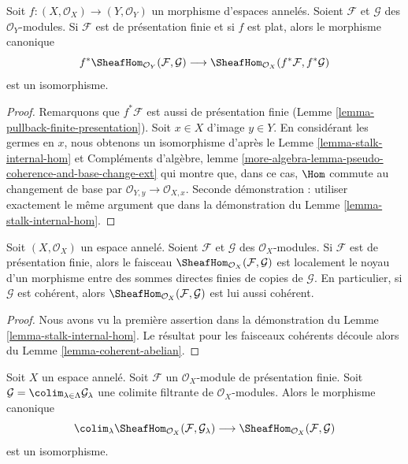\begin{lemma}
\label{lemma-pullback-internal-hom}
Soit $f : (X, \mathcal{O}_X) \to (Y, \mathcal{O}_Y)$ un morphisme
d'espaces annelés. Soient $\mathcal{F}$ et $\mathcal{G}$ des $\mathcal{O}_Y$-modules.
Si $\mathcal{F}$ est de présentation finie et si $f$ est plat,
alors le morphisme canonique
$$
f^*\SheafHom_{\mathcal{O}_Y}(\mathcal{F}, \mathcal{G})
\longrightarrow
\SheafHom_{\mathcal{O}_X}(f^*\mathcal{F}, f^*\mathcal{G})
$$
est un isomorphisme.
\end{lemma}

\begin{proof}
Remarquons que $f^*\mathcal{F}$ est aussi de présentation finie
(Lemme \ref{lemma-pullback-finite-presentation}).
Soit $x \in X$ d'image $y \in Y$. En considérant les germes
en $x$, nous obtenons un isomorphisme d'après le
Lemme \ref{lemma-stalk-internal-hom} et
Compléments d'algèbre, lemme
\ref{more-algebra-lemma-pseudo-coherence-and-base-change-ext}
qui montre que, dans ce cas, $\Hom$ commute au changement de base par
$\mathcal{O}_{Y, y} \to \mathcal{O}_{X, x}$.
Seconde démonstration : utiliser exactement le même argument que dans
la démonstration du Lemme \ref{lemma-stalk-internal-hom}.
\end{proof}

\begin{lemma}
\label{lemma-internal-hom-locally-kernel-direct-sum}
Soit $(X, \mathcal{O}_X)$ un espace annelé.
Soient $\mathcal{F}$ et $\mathcal{G}$ des $\mathcal{O}_X$-modules.
Si $\mathcal{F}$ est de présentation finie, alors le faisceau
$\SheafHom_{\mathcal{O}_X}(\mathcal{F}, \mathcal{G})$
est localement le noyau d'un morphisme entre des sommes directes finies
de copies de $\mathcal{G}$.
En particulier, si $\mathcal{G}$ est cohérent, alors
$\SheafHom_{\mathcal{O}_X}(\mathcal{F}, \mathcal{G})$
est lui aussi cohérent.
\end{lemma}

\begin{proof}
Nous avons vu la première assertion
dans la démonstration du Lemme \ref{lemma-stalk-internal-hom}.
Le résultat pour les faisceaux cohérents découle alors du
Lemme \ref{lemma-coherent-abelian}.
\end{proof}

\begin{lemma}
\label{lemma-hom-finite-presentation-colimit}
Soit $X$ un espace annelé. Soit $\mathcal{F}$ un $\mathcal{O}_X$-module
de présentation finie. Soit
$\mathcal{G} = \colim_{\lambda \in \Lambda} \mathcal{G}_\lambda$
une colimite filtrante de $\mathcal{O}_X$-modules. Alors le morphisme canonique
$$
\colim_\lambda \SheafHom_{\mathcal{O}_X}(\mathcal{F}, \mathcal{G}_\lambda)
\longrightarrow
\SheafHom_{\mathcal{O}_X}(\mathcal{F}, \mathcal{G})
$$
est un isomorphisme.
\end{lemma}

